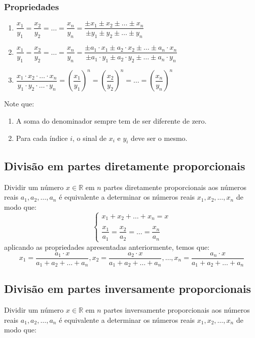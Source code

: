 \documentclass{article}
\begin{document}
\subsubsection{Propriedades}
\begin{enumerate}
    \item $\dfrac{x_1}{y_1}=\dfrac{x_2}{y_2}=\ldots=\dfrac{x_n}{y_n}=\dfrac{\pm x_1\pm x_2\pm\ldots\pm x_n}{\pm y_1\pm y_2 \pm\ldots\pm y_n}$
    \item $\dfrac{x_1}{y_1}=\dfrac{x_2}{y_2}=\ldots=\dfrac{x_n}{y_n}=\dfrac{\pm a_1\cdot x_1\pm a_2\cdot  x_2\pm\ldots\pm  a_n\cdot x_n}{\pm a_1\cdot  y_1\pm a_2\cdot  y_2 \pm\ldots\pm a_n\cdot  y_n}$
    \item $\dfrac{x_1\cdot x_2 \cdot\ldots\cdot x_n}{y_1\cdot y_2 \cdot\ldots\cdot y_n}=\left(\dfrac{x_1}{y_1}\right)^n=\left(\dfrac{x_2}{y_2}\right)^n=\ldots=\left(\dfrac{x_n}{y_n}\right)^n$
\end{enumerate}
Note que:
\begin{enumerate}
    \item A soma do denominador sempre tem de ser diferente de zero.
    \item Para cada índice $i$, o sinal de $x_i$ e $y_i$ deve ser o mesmo. 
\end{enumerate}

\subsection{Divisão em partes diretamente proporcionais}
Dividir um número $x \in\mathbb{R}$ em $n$ partes diretamente proporcionais aos números reais $a_1,a_2,\ldots,a_n$ é equivalente a determinar os números reais $x_1,x_2,\ldots,x_n$ de modo que:
\begin{equation*}
    \begin{cases}
        x_1+x_2+\ldots+x_n=x\\ \\
        \dfrac{x_1}{a_1}=\dfrac{x_2}{a_2}=\ldots=\dfrac{x_n}{a_n}
    \end{cases}
\end{equation*}
aplicando as propriedades apresentadas anteriormente, temos que:
\begin{equation*}
    x_1=\dfrac{a_1\cdot x}{a_1+a_2+\ldots+a_n}, x_2=\dfrac{a_2\cdot x}{a_1+a_2+\ldots+a_n}, \ldots, x_n=\dfrac{a_n\cdot x}{a_1+a_2+\ldots+a_n}
\end{equation*}

\subsection{Divisão em partes inversamente proporcionais}
Dividir um número $x \in\mathbb{R}$ em $n$ partes inversamente proporcionais aos números reais $a_1,a_2,\ldots,a_n$ é equivalente a determinar os números reais $x_1,x_2,\ldots,x_n$ de modo que:
\end{document}
